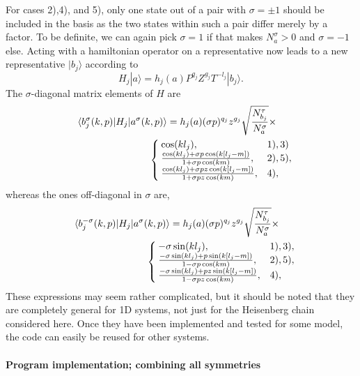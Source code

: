 \documentclass[draft,numberedheadings]{aipproc}
\begin{document}
For cases 2),4), and 5), only one state out of a pair with $\sigma = \pm 1$ should be included in the basis as the two states within such a pair differ merely 
by a factor. To be definite, we can again pick $\sigma=1$ if that makes $N^\sigma_a>0$ and $\sigma=-1$ else. Acting with a hamiltonian operator on a representative 
now leads to a new representative $|b_j\rangle$ according to
\begin{equation}
H_j|a\rangle = h_j(a)P^{q_j}Z^{g_j}T^{-l_j}|b_j\rangle.
\end{equation}
The $\sigma$-diagonal matrix elements of $H$ are
\begin{eqnarray}
&&\langle b_j^{\sigma}(k,p)|H_j|a^\sigma(k,p)\rangle = h_j(a) (\sigma p)^{q_j}z^{g_j}\sqrt{\frac{N^\tau_{b_j}}{N^\sigma_a}} 
\times \nonumber \hskip10mm \\
&& \hskip30mm \left\lbrace \begin{array}{ll}
\hskip-1.0mm \cos(kl_j), & 1), 3)\\
\hskip-1.0mm \frac{\cos(kl_j)+\sigma p\cos(k[l_j-m])}{1+\sigma p\cos(km)}, & 2), 5),\\
\hskip-1.0mm \frac{\cos(kl_j)+\sigma pz\cos(k[l_j-m])}{1+\sigma pz\cos(km)}, & 4),~~~~~~ 
\end{array}\right.  \label{hamkgpz1}
\end{eqnarray}
whereas the ones off-diagonal in $\sigma$ are,
\begin{eqnarray}
&&\langle b_j^{-\sigma}(k,p)|H_j|a^\sigma(k,p)\rangle = h_j(a) (\sigma p)^{q_j}z^{g_j}\sqrt{\frac{N^\tau_{b_j}}{N^\sigma_a}} 
\times \nonumber \hskip10mm \\
&& \hskip30mm\left\lbrace \begin{array}{ll}
\hskip-1.0mm -\sigma \sin(kl_j), & 1), 3), \\
\hskip-1.0mm \frac{-\sigma \sin(kl_j)+p\sin(k[l_j-m])}{1 -\sigma p\cos(km)}, & 2), 5),\\
\hskip-1.0mm \frac{-\sigma \sin(kl_j)+pz\sin(k[l_j-m])}{1- \sigma pz \cos(km)}, & 4),~~~~~~ 
\end{array}\right.  \label{hamkgpz2}
\end{eqnarray}
These expressions may seem rather complicated, but it should be noted that they are completely general for 1D systems, not just
for the Heisenberg chain considered here. Once they have been implemented and tested for some model, the code can easily be reused 
for other systems.

\paragraph{Program implementation; combining all symmetries}
\end{document}
